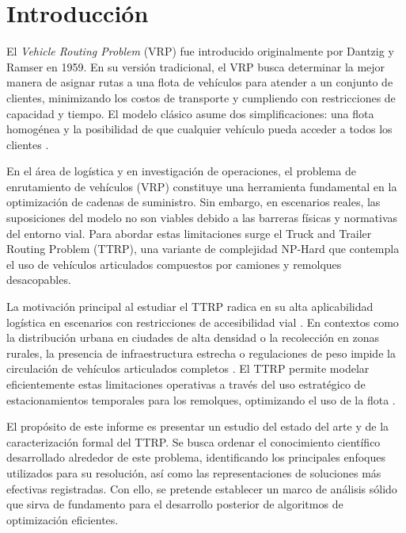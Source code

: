 \documentclass[letter, 10pt]{article}
\begin{document}
\newpage

\section{Introducci\'on}

El \textit{Vehicle Routing Problem} (VRP) fue introducido originalmente por Dantzig y Ramser en 1959. 
En su versi\'on tradicional, el VRP busca determinar la mejor manera de asignar rutas a una flota de veh\'iculos para atender a un conjunto de clientes, minimizando los costos de transporte y cumpliendo con restricciones de capacidad y tiempo.
El modelo cl\'asico asume dos simplificaciones: una flota homog\'enea y la posibilidad de que cualquier veh\'iculo pueda acceder a todos los clientes \cite{chao2002tabu, lin2009solving}.

\vspace{0.25cm}

En el \'area de log\'istica y en investigaci\'on de operaciones, el problema de enrutamiento de veh\'iculos (VRP) constituye una herramienta fundamental en la optimizaci\'on de cadenas de suministro. 
Sin embargo, en escenarios reales, las suposiciones del modelo no son viables debido a las barreras f\'isicas y normativas del entorno vial.
Para abordar estas limitaciones surge el Truck and Trailer Routing Problem (TTRP), una variante de complejidad NP-Hard que contempla el uso de veh\'iculos articulados compuestos por camiones y remolques desacopables.

\vspace{0.25cm}

La motivaci\'on principal al estudiar el TTRP radica en su alta aplicabilidad log\'istica en escenarios con restricciones de accesibilidad vial \cite{chao2002tabu, lin2009solving}. 
En contextos como la distribuci\'on urbana en ciudades de alta densidad o la recolecci\'on en zonas rurales, la presencia de infraestructura estrecha o regulaciones de peso impide la circulaci\'on de veh\'iculos articulados completos \cite{lin2009solving}. 
El TTRP permite modelar eficientemente estas limitaciones operativas a trav\'es del uso estrat\'egico de estacionamientos temporales para los remolques, optimizando el uso de la flota \cite{chao2002tabu, bartolini2020two}.

\vspace{0.25cm} 

El prop\'osito de este informe es presentar un estudio del estado del arte y de la caracterizaci\'on formal del TTRP. Se busca ordenar el conocimiento cient\'ifico desarrollado alrededor de este problema, identificando los principales enfoques utilizados para su resoluci\'on, as\'i como las representaciones de soluciones m\'as efectivas registradas. 
Con ello, se pretende establecer un marco de an\'alisis s\'olido que sirva de fundamento para el desarrollo posterior de algoritmos de optimizaci\'on eficientes. 
\end{document}
